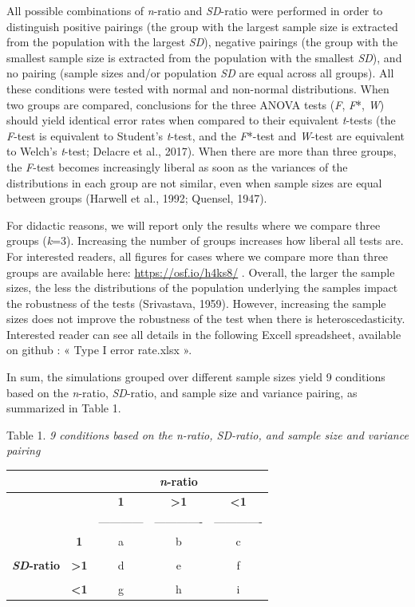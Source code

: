 \documentclass[man,floatsintext]{apa6}
\begin{document}
All possible combinations of \emph{n}-ratio and \emph{SD}-ratio were performed in order to distinguish positive pairings (the group with the largest sample size is extracted from the population with the largest \emph{SD}), negative pairings (the group with the smallest sample size is extracted from the population with the smallest \emph{SD}), and no pairing (sample sizes and/or population \emph{SD} are equal across all groups). All these conditions were tested with normal and non-normal distributions. When two groups are compared, conclusions for the three ANOVA tests (\emph{F}, \emph{F}*, \emph{W}) should yield identical error rates when compared to their equivalent \emph{t}-tests (the \emph{F}-test is equivalent to Student's \emph{t}-test, and the \emph{F}*-test and \emph{W}-test are equivalent to Welch's \emph{t}-test; Delacre et al., 2017). When there are more than three groups, the \emph{F}-test becomes increasingly liberal as soon as the variances of the distributions in each group are not similar, even when sample sizes are equal between groups (Harwell et al., 1992; Quensel, 1947).

For didactic reasons, we will report only the results where we compare three groups (\emph{k}=3). Increasing the number of groups increases how liberal all tests are. For interested readers, all figures for cases where we compare more than three groups are available here: \url{https://osf.io/h4ks8/} . Overall, the larger the sample sizes, the less the distributions of the population underlying the samples impact the robustness of the tests (Srivastava, 1959). However, increasing the sample sizes does not improve the robustness of the test when there is heteroscedasticity. Interested reader can see all details in the following Excell spreadsheet, available on github : « Type I error rate.xlsx ».

In sum, the simulations grouped over different sample sizes yield 9 conditions based on the \emph{n}-ratio, \emph{SD}-ratio, and sample size and variance pairing, as summarized in Table 1.

Table 1.
\emph{9 conditions based on the n-ratio, SD-ratio, and sample size and variance pairing}

\begin{longtable}[]{@{}ccccc@{}}
\toprule
& & & \textbf{\emph{n}-ratio} &\tabularnewline
\midrule
\endhead
& & \textbf{1} & \textbf{\textgreater{}1} & \textbf{\textless{}1}\tabularnewline
& & ------------ & ------------- & -------------\tabularnewline
& \textbf{1} & a & b & c\tabularnewline
& & & &\tabularnewline
\textbf{\emph{SD}-ratio} & \textbf{\textgreater{}1} & d & e & f\tabularnewline
& & & &\tabularnewline
& \textbf{\textless{}1} & g & h & i\tabularnewline
\bottomrule
\end{longtable}
\end{document}
